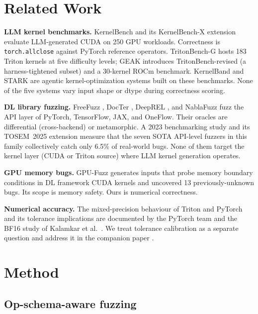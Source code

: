 \documentclass[runningheads]{llncs}
\begin{document}
\section{Related Work}
\label{sec:related}

\textbf{LLM kernel benchmarks.} KernelBench \cite{kernelbench2025} and
its KernelBench-X extension \cite{kernelbenchx2026} evaluate
LLM-generated CUDA on 250 GPU workloads. Correctness is
\texttt{torch.allclose} against PyTorch reference operators.
TritonBench-G hosts 183 Triton kernels at five difficulty levels;
GEAK \cite{geak2025} introduces TritonBench-revised (a harness-tightened
subset) and a 30-kernel ROCm benchmark. KernelBand \cite{kernelband2025}
and STARK \cite{stark2025} are agentic kernel-optimization systems
built on these benchmarks. None of the five systems vary input shape or
dtype during correctness scoring.

\textbf{DL library fuzzing.} FreeFuzz \cite{freefuzz2022},
DocTer \cite{docter2022}, DeepREL \cite{deeprel2022}, and NablaFuzz
\cite{nablafuzz2023} fuzz the API layer of PyTorch, TensorFlow, JAX,
and OneFlow. Their oracles are differential (cross-backend) or
metamorphic. A 2023 benchmarking study \cite{benchdlfuzzers2023} and its
TOSEM~2025 extension \cite{evalapifuzzers2025} measure that the seven
SOTA API-level fuzzers in this family collectively catch only 6.5\% of
real-world bugs. None of them target the kernel layer (CUDA or Triton
source) where LLM kernel generation operates.

\textbf{GPU memory bugs.} GPU-Fuzz \cite{gpufuzz2026} generates inputs
that probe memory boundary conditions in DL framework CUDA kernels and
uncovered 13 previously-unknown bugs. Its scope is memory safety. Ours
is numerical correctness.

\textbf{Numerical accuracy.} The mixed-precision behaviour of Triton
and PyTorch and its tolerance implications are documented by the
PyTorch team \cite{pytorchmixedprec} and the BF16 study of
Kalamkar et al.~\cite{bfloat16study}. We treat tolerance calibration as
a separate question and address it in the companion paper
\cite{gpuemuP2}.

\section{Method}
\label{sec:method}

\subsection{Op-schema-aware fuzzing}
\label{sec:method:fuzzing}
\end{document}
